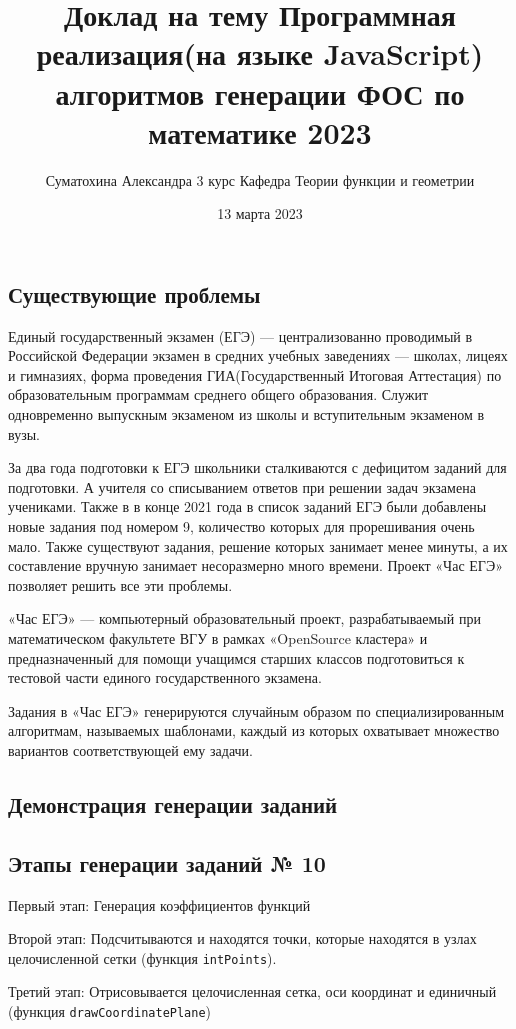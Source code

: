 \documentclass[a4paper, 12pt]{extarticle}
\title{Доклад на тему Программная реализация(на языке JavaScript) алгоритмов генерации ФОС по математике 2023}
\author{Суматохина Александра 3 курс Кафедра Теории функции и геометрии}
\date{13 марта 2023}
\begin{document}
    \maketitle
\subsection*{Существующие проблемы}
Единый государственный экзамен (ЕГЭ) — централизованно проводимый в Российской Федерации экзамен в средних учебных заведениях — школах, лицеях и гимназиях, форма проведения ГИА(Государственный Итоговая Аттестация) по образовательным программам среднего общего образования. 
Служит одновременно выпускным экзаменом из школы и вступительным экзаменом в вузы.

За два года подготовки к ЕГЭ школьники сталкиваются с дефицитом заданий для подготовки.
А учителя со списыванием ответов при решении задач экзамена учениками. 
Также в в конце 2021 года в список заданий ЕГЭ были добавлены новые задания под номером 9, 
количество которых для прорешивания очень мало. 
Также существуют задания, решение которых занимает менее минуты, а их составление вручную занимает несоразмерно много времени. 
Проект «Час ЕГЭ» позволяет решить все эти проблемы.

«Час ЕГЭ» — компьютерный образовательный проект, разрабатываемый при математическом 
факультете ВГУ в рамках «OpenSource кластера» и предназначенный для помощи учащимся 
старших классов подготовиться к тестовой части единого государственного экзамена.

Задания в «Час ЕГЭ» генерируются случайным образом по специализированным алгоритмам, называемых шаблонами, каждый из которых охватывает множество вариантов соответствующей ему задачи. 

\subsection*{Демонстрация генерации заданий}
\subsection*{Этапы генерации заданий № 10}

Первый этап: Генерация коэффициентов функций

Второй этап: Подсчитываются и находятся точки, которые находятся в узлах целочисленной сетки (функция \texttt{intPoints}).

Третий этап: Отрисовывается целочисленная сетка, оси координат и единичный  (функция \texttt{drawCoordinatePlane})
\end{document}
